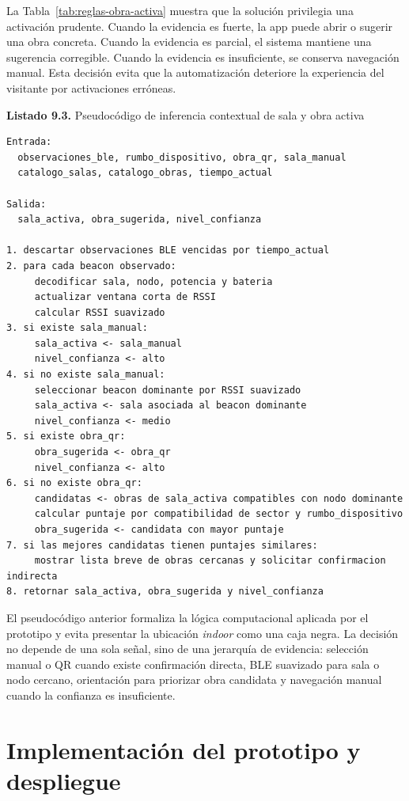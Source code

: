 La Tabla~\ref{tab:reglas-obra-activa} muestra que la soluci\'on privilegia una activaci\'on prudente. Cuando la evidencia es fuerte, la app puede abrir o sugerir una obra concreta. Cuando la evidencia es parcial, el sistema mantiene una sugerencia corregible. Cuando la evidencia es insuficiente, se conserva navegaci\'on manual. Esta decisi\'on evita que la automatizaci\'on deteriore la experiencia del visitante por activaciones err\'oneas.

\begin{center}
\textbf{Listado 9.3.} Pseudocódigo de inferencia contextual de sala y obra activa
\end{center}

\begin{lstlisting}[style=codebase]
Entrada:
  observaciones_ble, rumbo_dispositivo, obra_qr, sala_manual
  catalogo_salas, catalogo_obras, tiempo_actual

Salida:
  sala_activa, obra_sugerida, nivel_confianza

1. descartar observaciones BLE vencidas por tiempo_actual
2. para cada beacon observado:
     decodificar sala, nodo, potencia y bateria
     actualizar ventana corta de RSSI
     calcular RSSI suavizado
3. si existe sala_manual:
     sala_activa <- sala_manual
     nivel_confianza <- alto
4. si no existe sala_manual:
     seleccionar beacon dominante por RSSI suavizado
     sala_activa <- sala asociada al beacon dominante
     nivel_confianza <- medio
5. si existe obra_qr:
     obra_sugerida <- obra_qr
     nivel_confianza <- alto
6. si no existe obra_qr:
     candidatas <- obras de sala_activa compatibles con nodo dominante
     calcular puntaje por compatibilidad de sector y rumbo_dispositivo
     obra_sugerida <- candidata con mayor puntaje
7. si las mejores candidatas tienen puntajes similares:
     mostrar lista breve de obras cercanas y solicitar confirmacion indirecta
8. retornar sala_activa, obra_sugerida y nivel_confianza
\end{lstlisting}

El pseudocódigo anterior formaliza la lógica computacional aplicada por el prototipo y evita presentar la ubicación \textit{indoor} como una caja negra. La decisión no depende de una sola señal, sino de una jerarquía de evidencia: selección manual o QR cuando existe confirmación directa, BLE suavizado para sala o nodo cercano, orientación para priorizar obra candidata y navegación manual cuando la confianza es insuficiente.

\section{Implementación del prototipo y despliegue}

